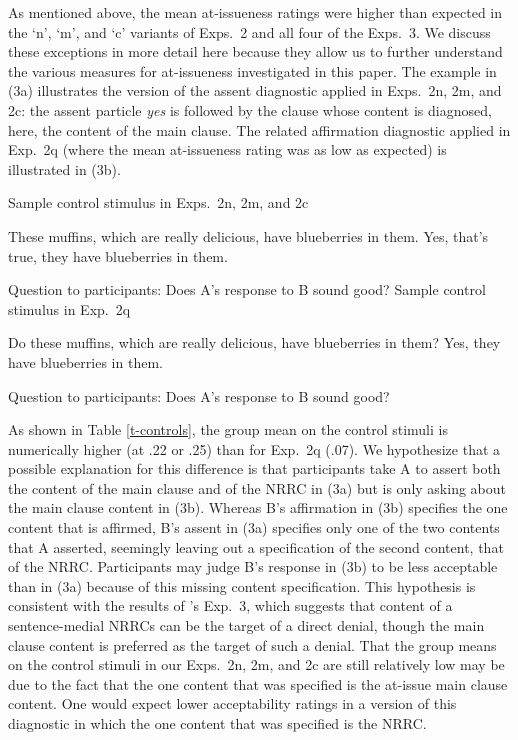 \documentclass[11pt,fleqn]{article}
\newcommand{\6}{\mbox{$[\hspace*{-.6mm}[$}}
\newcommand{\9}{\mbox{$]\hspace*{-.6mm}]$}}
\newcommand{\citepos}[1]{\citeauthor{#1}'s \citeyear{#1}}
\begin{document}
As mentioned above, the mean at-issueness ratings were higher than expected in the `n', `m', and `c' variants of Exps.~2 and all four of the Exps.~3. We discuss these exceptions in more detail here because they allow us to further understand the various measures for at-issueness investigated in this paper. The example in (3a) illustrates the version of the assent diagnostic applied in Exps.~2n, 2m, and 2c: the assent particle {\em yes} is followed by the clause whose content is diagnosed, here, the content of the main clause. The related affirmation diagnostic applied in Exp.~2q (where the mean at-issueness rating was as low as expected) is illustrated in (3b).

\begin{exe}
\begin{xlist}
\ex Sample control stimulus in Exps.~2n, 2m, and 2c
\begin{xlist}
 These muffins, which are really delicious, have blueberries in them.
 Yes, that's true, they have blueberries in them.
\end{xlist}
Question to participants: Does A's response to B sound good?
\ex Sample control stimulus in Exp.~2q
\begin{xlist}
 Do these muffins, which are really delicious, have blueberries in them?
 Yes, they have blueberries in them.
\end{xlist}
Question to participants: Does A's response to B sound good?
\end{xlist}
\end{exe}
As shown in Table \ref{t-controls},  the group mean on the control stimuli is numerically higher (at .22 or .25) than for Exp.~2q (.07). We hypothesize that a possible explanation for this difference is that participants take A to assert both the content of the main clause and of the NRRC in (3a) but is only asking about the main clause content in (3b). Whereas B's affirmation in (3b) specifies the one content that is affirmed, B's assent in (3a) specifies only one of the two contents that A asserted, seemingly leaving out a specification of the second content, that of the NRRC. Participants may judge B's response in (3b) to be less acceptable than in (3a) because of this missing content specification. This hypothesis is consistent with the results of \citepos{syrett-koev2015} Exp.~3, which suggests that content of a sentence-medial NRRCs can be the target of a direct denial, though the main clause content is preferred as the target of such a denial. That the group means on the control stimuli in our Exps.~2n, 2m, and 2c are still relatively low may be due to the fact that the one content that was specified is the at-issue main clause content. One would expect lower acceptability ratings in a version of this diagnostic in which the one content that was specified is the NRRC. 
\end{document}
